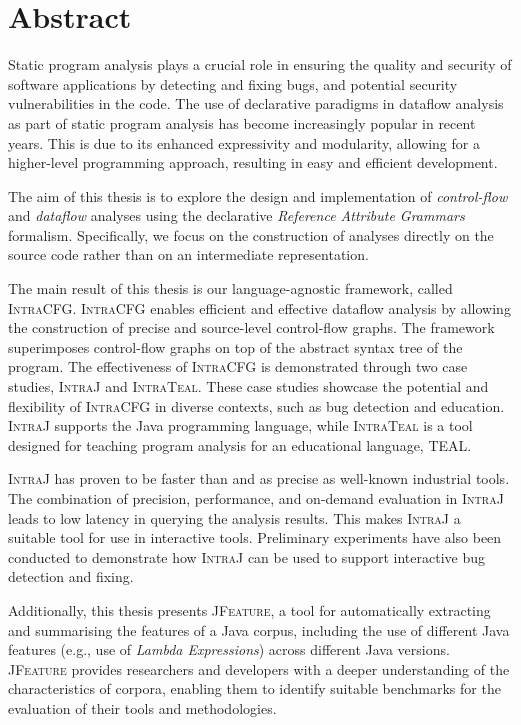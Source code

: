 \chapter{Abstract}

\vspace{-0.5cm}
Static program analysis plays a crucial role in ensuring the quality and security of
software applications by detecting and fixing bugs,
and potential security vulnerabilities in the code. The use of declarative
paradigms in dataflow analysis as part of static program analysis has become
increasingly popular in recent years. This is due to its enhanced expressivity
and modularity, allowing for a higher-level programming approach, resulting in
easy and efficient development.

The aim of this thesis is to explore the design and implementation of \emph{control-flow} and
\emph{dataflow} analyses using the declarative \emph{Reference Attribute Grammars} formalism.
Specifically, we focus on the construction of analyses directly on the source code
rather than on an intermediate representation.

The main result of this thesis is our language-agnostic framework, called \textsc{IntraCFG}.
\textsc{IntraCFG} enables efficient and effective dataflow analysis by allowing the construction of precise and
source-level control-flow graphs. The framework superimposes control-flow
graphs on top of the abstract syntax tree of the program.
The effectiveness of \textsc{IntraCFG} is demonstrated through two case studies,
\textsc{IntraJ} and \textsc{IntraTeal}. These case studies showcase the potential and
flexibility of \textsc{IntraCFG} in diverse contexts, such as bug detection and education.
\textsc{IntraJ} supports the Java programming language, while
\textsc{IntraTeal} is a tool designed for teaching program analysis for an educational language, TEAL.

\textsc{IntraJ} has proven to be faster than and as precise as well-known
industrial tools.
The combination of precision, performance, and on-demand evaluation in \textsc{IntraJ}
leads to low latency in querying the analysis results. This makes \textsc{IntraJ} a
suitable tool for use in interactive tools. Preliminary experiments have also
been conducted to demonstrate how \textsc{IntraJ} can be used to support interactive
bug detection and fixing.

Additionally, this thesis presents \textsc{JFeature}, a tool for automatically extracting
and summarising the features of a Java corpus, including the use of different Java features (e.g., use of \emph{Lambda Expressions}) across different
Java versions. \textsc{JFeature} provides
researchers and developers with a deeper understanding of the characteristics of
corpora, enabling them to identify suitable benchmarks for the evaluation of their
tools and methodologies.
